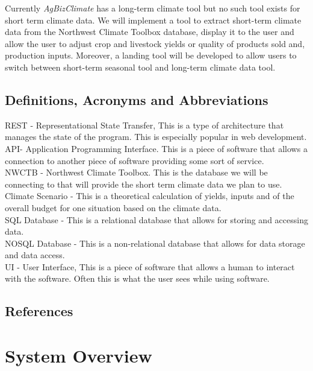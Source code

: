 \documentclass[onecolumn, draftclsnofoot,10pt, compsoc]{article}
\begin{document}
			Currently \textit{AgBizClimate} has a long-term climate tool but no such tool exists for short term climate data. We will implement a tool to extract short-term climate data from the Northwest Climate Toolbox database, display it to the user and allow the user to adjust crop and livestock yields or quality of products sold and, production inputs. Moreover, a landing tool will be developed to allow users to switch between short-term seasonal tool and long-term climate data tool.\\

		\subsection{Definitions, Acronyms and Abbreviations}
			REST - Representational State Transfer, This is a type of architecture that manages the state of the program. This is especially popular in web development.\\
			API- Application Programming Interface. This is a piece of software that allows a connection to another piece of software providing some sort of service.\\
			NWCTB - Northwest Climate Toolbox. This is the database we will be connecting to that will provide the short term climate data we plan to use.\\
			Climate Scenario - This is a theoretical calculation of yields, inputs and of the overall budget for one situation based on the climate data.\\
			SQL Database - This is a relational database that allows for storing and accessing data.\\
			NOSQL Database - This is a non-relational database that allows for data storage and data access.\\
			UI - User Interface, This is a piece of software that allows a human to interact with the software. Often this is what the user sees while using software.

			\renewcommand\refname{\vskip -1cm}
		\subsection{References}

		\nocite{*}
    
    


\section{System Overview}
\end{document}
